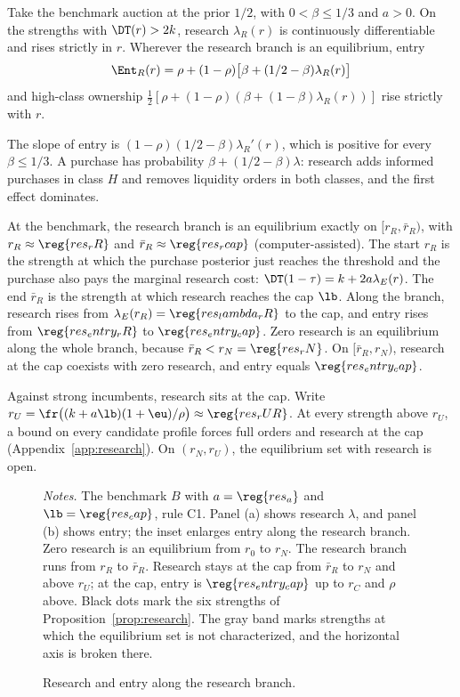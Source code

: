 \begin{corollary}\label{prop:researchbranch}
Take the benchmark auction at the prior \(1/2\), with \(0<\beta\le1/3\) and \(a>0\). On the strengths with
\(\DT(r)>2k\), research \(\lambda_R(r)\) is continuously differentiable and rises strictly in \(r\). Wherever the
research branch is an equilibrium, entry
\[
\Ent_R(r)=\rho+(1-\rho)\bigl[\beta+(1/2-\beta)\lambda_R(r)\bigr]
\]
and high-class ownership \(\tfrac12[\rho+(1-\rho)(\beta+(1-\beta)\lambda_R(r))]\) rise strictly with \(r\).
\end{corollary}

The slope of entry is \((1-\rho)(1/2-\beta)\lambda_R'(r)\), which is positive for every \(\beta\le1/3\). A purchase
has probability \(\beta+(1/2-\beta)\lambda\): research adds informed purchases in class \(H\) and removes liquidity
orders in both classes, and the first effect dominates.

At the benchmark, the research branch is an equilibrium exactly on \([r_R,\bar r_R)\), with \(r_R\approx\reg{res_rR}\)
and \(\bar r_R\approx\reg{res_rcap}\) (computer-assisted). The start \(r_R\) is the strength at which the purchase
posterior just reaches the threshold and the purchase also pays the marginal research cost:
\(\DT(1-\tau)=k+2a\lambda_E(r)\). The end \(\bar r_R\) is the strength at which research reaches the cap \(\lb\). Along
the branch, research rises from \(\lambda_E(r_R)=\reg{res_lambda_rR}\) to the cap, and entry rises from
\(\reg{res_entry_rR}\) to \(\reg{res_entry_cap}\). Zero research is an equilibrium along the whole branch, because
\(\bar r_R<r_N=\reg{res_rN}\). On \([\bar r_R,r_N)\), research at the cap coexists with zero research, and entry equals
\(\reg{res_entry_cap}\).

Against strong incumbents, research sits at the cap. Write
\(r_U=\fr\bigl((k+a\lb)(1+\eu)/\rho\bigr)\approx\reg{res_rUR}\). At every strength above \(r_U\), a bound on every
candidate profile forces full orders and research at the cap (Appendix~\ref{app:research}). On \((r_N,r_U)\), the
equilibrium set with research is open.

\begin{figure}[tbp]
\centering
{}
\caption{Research and entry along the research branch.}\label{fig:research}
\par\medskip
\begin{minipage}{\linewidth}\footnotesize\singlespacing
\textit{Notes.} The benchmark \(B\) with \(a=\reg{res_a}\) and \(\lb=\reg{res_cap}\), rule C1. Panel (a) shows
research \(\lambda\), and panel (b) shows entry; the inset enlarges entry along the research branch. Zero research is an
equilibrium from \(r_0\) to \(r_N\). The research branch runs from \(r_R\) to \(\bar r_R\). Research stays at the cap
from \(\bar r_R\) to \(r_N\) and above \(r_U\); at the cap, entry is \(\reg{res_entry_cap}\) up to \(r_C\) and
\(\rho\) above. Black dots mark the six strengths of Proposition~\ref{prop:research}. The gray band marks strengths
at which the equilibrium set is not characterized, and the horizontal axis is broken there.
\end{minipage}
\end{figure}

